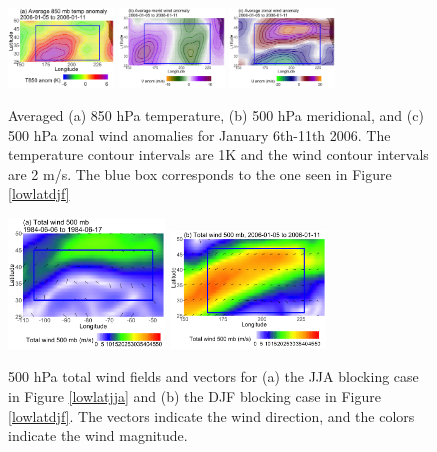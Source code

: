 \documentclass[smallextended]{svjour3}       %
\numberwithin{equation}{section}
\begin{document}
\begin{figure}
\centering
\includegraphics[width=0.25\textwidth]{fig13a}
\includegraphics[width=0.25\textwidth]{fig13b}
\includegraphics[width=0.25\textwidth]{fig13c}
\caption{Averaged (a) 850 hPa temperature, (b) 500 hPa meridional, and (c) 500 hPa zonal wind anomalies for January 6th-11th 2006. The temperature contour intervals are 1K and the wind contour intervals are 2 m/s. The blue box corresponds to the one seen in Figure \ref{lowlatdjf}}\label{avgdjf}
\end{figure}

\begin{figure}
\centering
\includegraphics[width=0.37\textwidth]{fig14a}
\includegraphics[width=0.37\textwidth]{fig14b}
\caption{500 hPa total wind fields and vectors for (a) the JJA blocking case in Figure \ref{lowlatjja} and (b) the DJF blocking case in Figure \ref{lowlatdjf}. The vectors indicate the wind direction, and the colors indicate the wind magnitude.}\label{totwind}
\end{figure}
\end{document}
